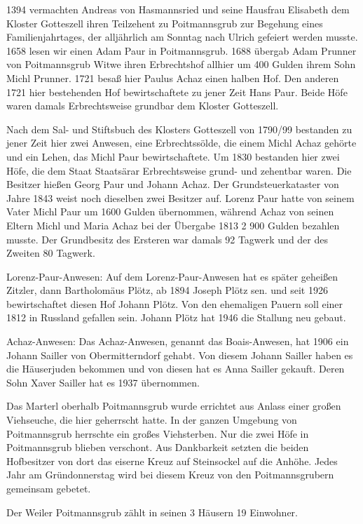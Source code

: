 1394 vermachten Andreas von Hasmannsried und seine Hausfrau Elisabeth dem
Kloster Gotteszell ihren Teilzehent zu Poitmannsgrub zur Begehung eines
Familienjahrtages, der alljährlich am Sonntag nach Ulrich gefeiert werden
musste. 1658 lesen wir einen Adam Paur in Poitmannsgrub. 1688 übergab Adam
Prunner von Poitmannsgrub Witwe ihren Erbrechtshof allhier um 400 Gulden ihrem
Sohn Michl Prunner. 1721 besaß hier Paulus Achaz einen halben Hof. Den anderen
1721 hier bestehenden Hof bewirtschaftete zu jener Zeit Hans Paur. Beide Höfe
waren damals Erbrechtsweise grundbar dem Kloster Gotteszell.

Nach dem Sal- und Stiftsbuch des Klosters Gotteszell von 1790/99 bestanden zu
jener Zeit hier zwei Anwesen, eine Erbrechtssölde, die einem Michl Achaz gehörte
und ein Lehen, das Michl Paur bewirtschaftete. Um 1830 bestanden hier zwei Höfe,
die dem Staat Staatsärar Erbrechtsweise grund- und zehentbar waren. Die Besitzer
hießen Georg Paur und Johann Achaz. Der Grundsteuerkataster von Jahre 1843 weist
noch dieselben zwei Besitzer auf. Lorenz Paur hatte von seinem Vater Michl Paur
um 1600 Gulden übernommen, während Achaz von seinen Eltern Michl und Maria Achaz
bei der Übergabe 1813 2 900 Gulden bezahlen musste. Der Grundbesitz des Ersteren
war damals 92 Tagwerk und der des Zweiten 80 Tagwerk.

Lorenz-Paur-Anwesen: Auf dem Lorenz-Paur-Anwesen hat es später geheißen Zitzler,
dann Bartholomäus Plötz, ab 1894 Joseph Plötz sen. und seit 1926 bewirtschaftet
diesen Hof Johann Plötz. Von den ehemaligen Pauern soll einer 1812 in Russland
gefallen sein. Johann Plötz hat 1946 die Stallung neu gebaut.

Achaz-Anwesen: Das Achaz-Anwesen, genannt das Boais-Anwesen, hat 1906 ein Johann
Sailler von Obermitterndorf gehabt. Von diesem Johann Sailler haben es die
Häuserjuden bekommen und von diesen hat es Anna Sailler gekauft. Deren Sohn
Xaver Sailler hat es 1937 übernommen.

Das Marterl oberhalb Poitmannsgrub wurde errichtet aus Anlass einer großen
Viehseuche, die hier geherrscht hatte. In der ganzen Umgebung von Poitmannsgrub
herrschte ein großes Viehsterben. Nur die zwei Höfe in Poitmannsgrub blieben
verschont. Aus Dankbarkeit setzten die beiden Hofbesitzer von dort das eiserne
Kreuz auf Steinsockel auf die Anhöhe. Jedes Jahr am Gründonnerstag wird bei
diesem Kreuz von den Poitmannsgrubern gemeinsam gebetet.

Der Weiler Poitmannsgrub zählt in seinen 3 Häusern 19 Einwohner.

